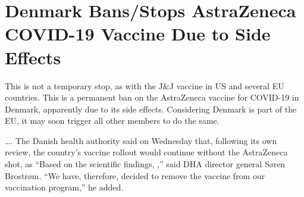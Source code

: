 \chapter{Denmark Bans/Stops AstraZeneca COVID-19 Vaccine Due to Side Effects}

\begin{refsection}

This is not a temporary stop, as with the J\&J vaccine in US and several EU countries. This is a permanent ban on the AstraZeneca vaccine for COVID-19 in Denmark, apparently due to its side effects. Considering Denmark is part of the EU, it may soon trigger all other members to do the same.

\begin{tcolorbox}[quote]

\dots{}. The Danish health authority said on Wednesday that, following its own review, the country's vaccine rollout would continue without the AstraZeneca shot,\textsuperscript{\cite{url3c5e9232}} as  \enquote{Based on the scientific findings, ,} said DHA director general Søren Brostrøm. \enquote{We have, therefore, decided to remove the vaccine from our vaccination program,} he added.\textsuperscript{\cite{url9asdu32j}}

\end{tcolorbox}

\printbibliography[heading=subbibliography]

\end{refsection}